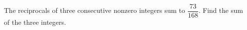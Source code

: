 The reciprocals of three consecutive nonzero integers sum to $\dfrac{73}{168}$. Find the sum of the three integers.
